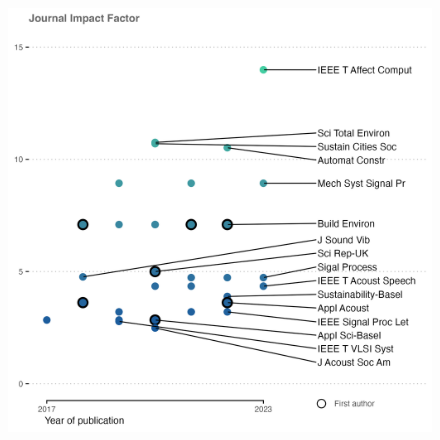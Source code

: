\documentclass[
]{report}
\begin{document}
\begin{figure}

{\centering \includegraphics{images/journalIF.png}

}

\end{figure}
\end{document}

